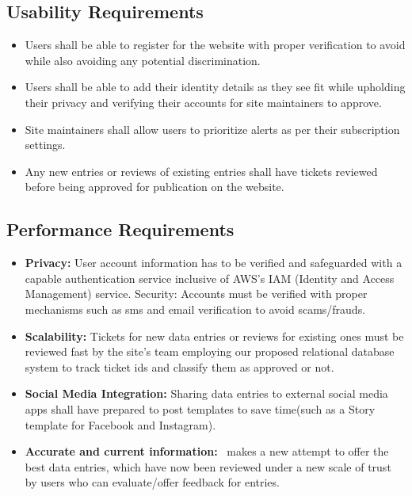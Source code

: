 \vspace*{\fill}
\newpage

\subsection{Usability Requirements}

\begin{itemize}
  \item Users shall be able to register for the website with proper verification to avoid while also avoiding any potential discrimination.
  \item Users shall be able to add their identity details as they see fit while upholding their privacy and verifying their accounts for site maintainers to approve.
  \item Site maintainers shall allow users to prioritize alerts as per their subscription settings.
  \item Any new entries or reviews of existing entries shall have tickets reviewed before being approved for publication on the website.
\end{itemize}

\subsection{Performance Requirements}

\begin{itemize}
  \item \textbf{Privacy:} User account information has to be verified and safeguarded with a capable authentication service inclusive of AWS's IAM (Identity and Access Management) service.
  Security: Accounts must be verified with proper mechanisms such as sms and email verification to avoid scams/frauds.
  \item \textbf{Scalability:} Tickets for new data entries or reviews for existing ones must be reviewed fast by the site's team employing our proposed relational database system to track ticket ids and classify them as approved or not.
  \item \textbf{Social Media Integration:} Sharing data entries to external social media apps shall have prepared to post templates to save time(such as a Story template for Facebook and Instagram).
  \item \textbf{Accurate and current information:} \afetbilgi\ makes a new attempt to offer the best data entries, which have now been reviewed under a new scale of trust by users who can evaluate/offer feedback for entries.
\end{itemize}

